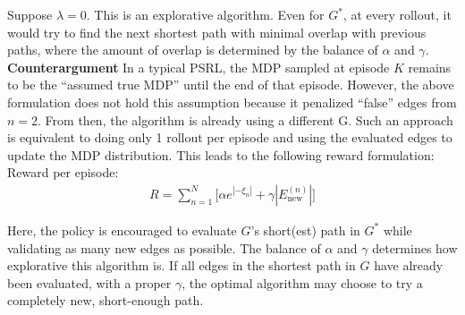 \documentclass[10pt]{article}
\begin{document}
\noindent Suppose $\lambda=0$. This is an explorative algorithm. Even for $G^*$, at every rollout, it would try to find the next shortest path with minimal overlap with previous paths, where the amount of overlap is determined by the balance of $\alpha$ and $\gamma$.\\

\noindent\textbf{Counterargument} In a typical PSRL, the MDP sampled at episode $K$ remains to be the ``assumed true MDP'' until the end of that episode. However, the above formulation does not hold this assumption because it penalized ``false'' edges from $n=2$. From then, the algorithm is already using a different G. Such an approach is equivalent to doing only 1 rollout per episode and using the evaluated edges to update the MDP distribution. This leads to the following reward formulation:\\


\noindent Reward per episode:
\begin{align*}
R = \sum_{n=1}^N \bigg[\alpha e^{|-\xi_n|} + \gamma |E_\text{new}^{(n)}|\bigg]
\end{align*}

\noindent Here, the policy is encouraged to evaluate $G$'s short(est) path in $G^*$ while validating as many new edges as possible. The balance of $\alpha$ and $\gamma$ determines how explorative this algorithm is. If all edges in the shortest path in $G$ have already been evaluated, with a proper $\gamma$, the optimal algorithm may choose to try a completely new, short-enough path.
\end{document}
